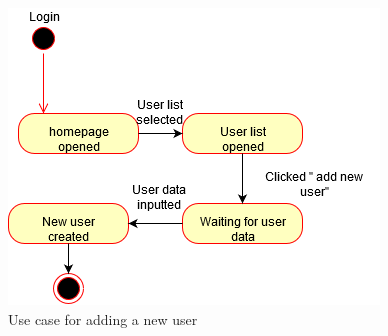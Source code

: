 \begin{figure}[H]
    \centering
    \includegraphics[scale=0.7, clip]{figures/useCaseAddMember.png}
    \caption{Use case for adding a new user}
    \label{fig:useCaseAddMember}
\end{figure}
\newpage


